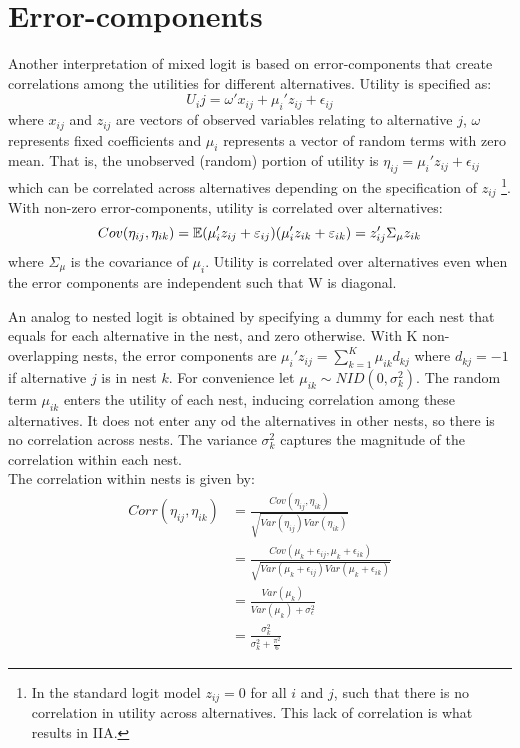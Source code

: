 \documentclass[DIV=14,titlepage=false]{scrreprt}
\begin{document}
\section{Error-components}
Another interpretation of mixed logit is based on error-components that create correlations among the utilities for different alternatives. Utility is specified as:
\[
    U_ij = \omega'x_{ij} + \mu_i'z_{ij} + \epsilon_{ij}
\]
where $x_{ij}$ and $z_{ij}$ are vectors of observed variables relating to alternative $j$, $\omega$ represents fixed coefficients and $\mu_i$ represents a vector of random terms with zero mean. That is, the unobserved (random) portion of utility is $\eta_{ij} = \mu_i'z_{ij} + \epsilon_{ij}$ which can be correlated across alternatives depending on the specification of $z_{ij}$ \footnote{In the standard logit model $z_{ij} = 0$ for all $i$ and $j$, such that there is no correlation in utility across alternatives. This lack of correlation is what results in IIA.}.\\
With non-zero error-components, utility is correlated over alternatives:
\[
    Cov(\eta_{ij}, \eta_{ik}) = \mathbb{E}(\mu_i'z_{ij} + \varepsilon_{ij})(\mu_i'z_{ik} + \varepsilon_{ik}) = z_{ij}'\Sigma_\mu z_{ik}
\]
where $\Sigma_\mu$ is the covariance of $\mu_i$. Utility is correlated over alternatives even when the error components are independent such that W is diagonal.
\begin{example}
    An analog to nested logit is obtained by specifying a dummy for each nest that equals for each alternative in the nest, and zero otherwise. With K non-overlapping nests, the error components are $\mu_i ' z_{ij} = \sum_{k=1}^{K} \mu_{ik}d_{kj}$ where $d_{kj}=-1$ if alternative $j$ is in nest $k$. For convenience let $\mu_{ik} \sim NID(0, \sigma^2_k)$. The random term $\mu_{ik}$ enters the utility of each nest, inducing correlation among these alternatives. It does not enter any od the alternatives in other nests, so there is no correlation across nests. The variance $\sigma^2_k$ captures the magnitude of the correlation within each nest.\\
    The correlation within nests is given by:
    \begin{align*}
        Corr(\eta_{ij}, \eta_{ik})& = \frac{Cov(\eta_{ij}, \eta_{ik})}{\sqrt{Var(\eta_{ij})Var(\eta_{ik})}}\\
        &= \frac{Cov(\mu_{k} + \epsilon_{ij},\mu_{k} + \epsilon_{ik})}{\sqrt{Var(\mu_{k} + \epsilon_{ij})Var(\mu_{k} + \epsilon_{ik})}}\\
        &= \frac{Var(\mu_{k})}{Var(\mu_{k}) + \sigma^2_{\epsilon}}\\
        &= \frac{\sigma^2_k}{\sigma^2_k + \frac{\pi^2}{6}}
    \end{align*}
\end{example}
\end{document}
